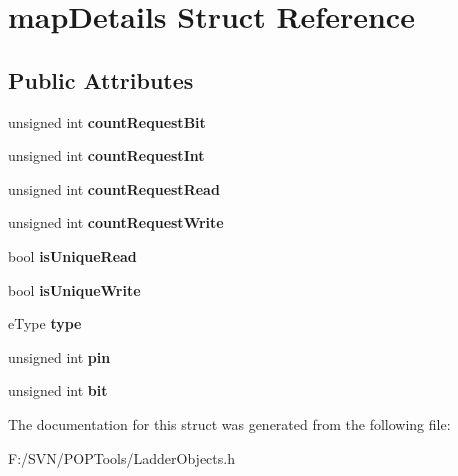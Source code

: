 \hypertarget{structmap_details}{\section{map\-Details Struct Reference}
\label{structmap_details}
}
\subsection*{Public Attributes}
\begin{DoxyCompactItemize}
\item 
\hypertarget{structmap_details_af86a1dea8bd7953aadd72d53924ed87c}{unsigned int {\bfseries count\-Request\-Bit}}\label{structmap_details_af86a1dea8bd7953aadd72d53924ed87c}

\item 
\hypertarget{structmap_details_af9ba35e3301e7b5701101e97c291ac6b}{unsigned int {\bfseries count\-Request\-Int}}\label{structmap_details_af9ba35e3301e7b5701101e97c291ac6b}

\item 
\hypertarget{structmap_details_a70c418b3d4ffab21386d6fc64b74effb}{unsigned int {\bfseries count\-Request\-Read}}\label{structmap_details_a70c418b3d4ffab21386d6fc64b74effb}

\item 
\hypertarget{structmap_details_a92d32d447a792aa417c34a52419a5ede}{unsigned int {\bfseries count\-Request\-Write}}\label{structmap_details_a92d32d447a792aa417c34a52419a5ede}

\item 
\hypertarget{structmap_details_a917982a430a094e29bc55aa13dd64f6e}{bool {\bfseries is\-Unique\-Read}}\label{structmap_details_a917982a430a094e29bc55aa13dd64f6e}

\item 
\hypertarget{structmap_details_ae36a3c50e1e5db75e7f40e48840d71a2}{bool {\bfseries is\-Unique\-Write}}\label{structmap_details_ae36a3c50e1e5db75e7f40e48840d71a2}

\item 
\hypertarget{structmap_details_a8575983d3c50e2f5b0be0cef38a36e9c}{e\-Type {\bfseries type}}\label{structmap_details_a8575983d3c50e2f5b0be0cef38a36e9c}

\item 
\hypertarget{structmap_details_a064662452d99a8c04ca657351642e2d9}{unsigned int {\bfseries pin}}\label{structmap_details_a064662452d99a8c04ca657351642e2d9}

\item 
\hypertarget{structmap_details_ad4776dabc2fe18c9a48e821da335f0d1}{unsigned int {\bfseries bit}}\label{structmap_details_ad4776dabc2fe18c9a48e821da335f0d1}

\end{DoxyCompactItemize}


The documentation for this struct was generated from the following file\-:\begin{DoxyCompactItemize}
\item 
F\-:/\-S\-V\-N/\-P\-O\-P\-Tools/Ladder\-Objects.\-h\end{DoxyCompactItemize}
